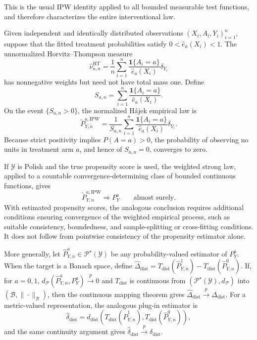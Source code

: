 \documentclass[11pt,a4paper]{article}
\theoremstyle{plain}
\theoremstyle{definition}
\theoremstyle{remark}
\newcommand{\1}{\mathbbm{1}}
\begin{document}
This is the usual IPW identity applied to all bounded measurable test functions, and therefore characterizes the entire interventional law.

Given independent and identically distributed observations
\((X_i,A_i,Y_i)_{i=1}^n\), suppose that the fitted treatment probabilities satisfy \(0<\widehat e_a(X_i)<1\). The unnormalized Horvitz--Thompson measure
\[
\widehat\nu_{a,n}^{\mathrm{HT}}
=
\frac1n
\sum_{i=1}^n
\frac{\mathbf 1\{A_i=a\}}
     {\widehat e_a(X_i)}
\delta_{Y_i}
\]
has nonnegative weights but need not have total mass one. Define
\[
S_{a,n}
=
\sum_{i=1}^n
\frac{\mathbf 1\{A_i=a\}}
     {\widehat e_a(X_i)}.
\]
On the event \(\{S_{a,n}>0\}\), the normalized Hájek empirical law is
\[
\widetilde P_{Y,n}^{a,\mathrm{IPW}}
=
\frac{1}{S_{a,n}}
\sum_{i=1}^n
\frac{\mathbf 1\{A_i=a\}}
     {\widehat e_a(X_i)}
\delta_{Y_i}.
\]
Because strict positivity implies \(P(A=a)>0\), the probability of observing no units in treatment arm \(a\), and hence of \(S_{a,n}=0\), converges to zero.

If \(\mathcal Y\) is Polish and the true propensity score is used, the weighted strong law, applied to a countable convergence-determining class of bounded continuous functions, gives
\[
\widetilde P_{Y,n}^{a,\mathrm{IPW}}
\Longrightarrow
P_Y^a
\qquad\text{almost surely}.
\]
With estimated propensity scores, the analogous conclusion requires additional conditions ensuring convergence of the weighted empirical process, such as suitable consistency, boundedness, and sample-splitting or cross-fitting conditions. It does not follow from pointwise consistency of the propensity estimator alone.

More generally, let
\(\widehat P_{Y,n}^a\in\mathcal P^\star(\mathcal Y)\) be any probability-valued estimator of \(P_Y^a\). When the target is a Banach space, define
\(\widehat\Delta_{\mathrm{dist}} = T_{\mathrm{dist}}(\widehat P_{Y,n}^1) - T_{\mathrm{dist}}(\widehat P_{Y,n}^0)\). If, for \(a=0,1\), \(d_{\mathcal P}(\widehat P_{Y,n}^a,P_Y^a) \xrightarrow{p}0 \) and \(T_{\mathrm{dist}}\) is continuous from \((\mathcal P^\star(\mathcal Y),d_{\mathcal P})\) into
\((\mathcal B,\|\cdot\|_{\mathcal B})\), then the continuous mapping theorem gives \(\widehat\Delta_{\mathrm{dist}} \xrightarrow{p} \Delta_{\mathrm{dist}}\). For a metric-valued representation, the analogous plug-in estimator is
\[
\widehat\delta_{\mathrm{dist}}
=
d_{\mathrm{dist}}\!\left(
T_{\mathrm{dist}}(\widehat P_{Y,n}^1),
T_{\mathrm{dist}}(\widehat P_{Y,n}^0)
\right),
\]
and the same continuity argument gives
\(\widehat\delta_{\mathrm{dist}}\xrightarrow{p}\delta_{\mathrm{dist}}\).
\end{document}
